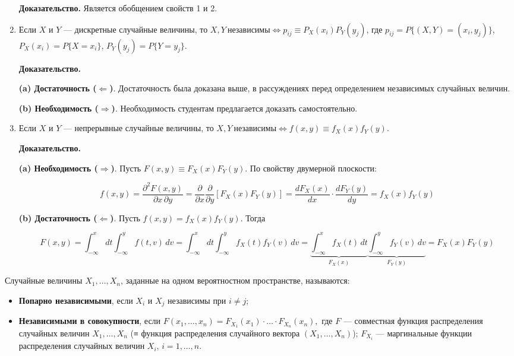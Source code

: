 \begin{enumerate}
	\textbf{Доказательство.} Является обобщением свойств 1 и 2.
	
	\item Если \( X \) и \( Y \) — дискретные случайные величины, то $X, Y \ \text{независимы} \Leftrightarrow p_{ij} \equiv P_X(x_i) P_Y(y_j)$,\newline
	где \( p_{ij} = P\{ (X, Y) = (x_i, y_j) \} \), \( P_X(x_i) = P\{ X = x_i \} \), \( P_Y(y_j) = P\{ Y = y_j \} \).
	
	\textbf{Доказательство.}
	
	\textbf{(a) Достаточность (\( \Leftarrow \))}.  
	Достаточность была доказана выше, в рассуждениях перед определением независимых случайных величин.
	
	\textbf{(b) Необходимость (\( \Rightarrow \))}.  
	Необходимость студентам предлагается доказать самостоятельно.
	
	\item Если \( X \) и \( Y \) — непрерывные случайные величины, то $X, Y \ \text{независимы} \Leftrightarrow f(x, y) \equiv f_X(x) f_Y(y)$.
	
	\textbf{Доказательство.}
	
	\textbf{(a) Необходимость (\( \Rightarrow \))}.  
	Пусть \( F(x, y) \equiv F_X(x) F_Y(y) \). По свойству двумерной плоскости:
	
	\[
	f(x, y) = \frac{\partial^2 F(x, y)}{\partial x \, \partial y} = \frac{\partial}{\partial x} \frac{\partial}{\partial y} [F_X(x) F_Y(y)] = \frac{d F_X(x)}{dx} \cdot \frac{d F_Y(y)}{dy} = f_X(x) f_Y(y)
	\]
	
	\textbf{(b) Достаточность (\( \Leftarrow \))}.  
	Пусть \( f(x, y) = f_X(x) f_Y(y) \). Тогда
	
	\[
	F(x, y) = \int_{-\infty}^{x} dt \int_{-\infty}^{y} f(t, v) \, dv =
	\int_{-\infty}^{x} dt \int_{-\infty}^{y} f_X(t) f_Y(v) \, dv = \underbrace{\int_{-\infty}^{x} f_X(t) \, dt}_{F_X(x)} \underbrace{\int_{-\infty}^{y} f_Y(v) \, dv}_{F_Y(y)} = F_X(x) F_Y(y)
	\]
\end{enumerate}


Случайные величины \( X_1, \dots, X_n \), заданные на одном вероятностном пространстве, называются:
\begin{itemize}
	\item \textbf{Попарно независимыми}, если \( X_i \) и \( X_j \) независимы при \( i \neq j \);
	\item \textbf{Независимыми в совокупности}, если $
	F(x_1, \dots, x_n) = F_{X_1}(x_1) \cdot \dots \cdot F_{X_n}(x_n),$
	где \( F \) — совместная функция распределения случайных величин \( X_1, \dots, X_n \) (≡ функция распределения случайного вектора \( (X_1, \dots, X_n) \)); \( F_{X_i} \) — маргинальные функции распределения случайных величин \( X_i \), \( i = 1, \dots, n \).
\end{itemize}

